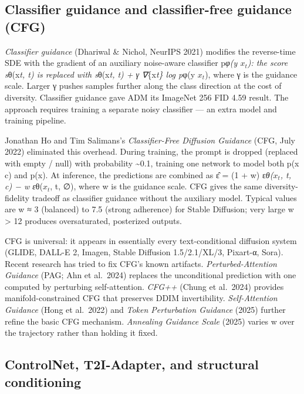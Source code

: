 \subsection{Classifier guidance and classifier-free guidance (CFG)}\label{classifier-guidance-and-classifier-free-guidance-cfg}

\emph{Classifier guidance} (Dhariwal \& Nichol, NeurIPS 2021) modifies the reverse-time SDE with the gradient of an auxiliary noise-aware classifier p\emph{φ(y \textbar{} \(x_t\)): the score s}θ(x\emph{t, t) is replaced with s}θ(x\emph{t, t) + γ ∇}\{x\emph{t\} log p}φ(y \textbar{} \(x_t\)), where γ is the guidance scale. Larger γ pushes samples further along the class direction at the cost of diversity. Classifier guidance gave ADM its ImageNet 256 FID 4.59 result. The approach requires training a separate noisy classifier --- an extra model and training pipeline.

Jonathan Ho and Tim Salimans's \emph{Classifier-Free Diffusion Guidance} (CFG, July 2022) eliminated this overhead. During training, the prompt is dropped (replaced with empty / null) with probability \textasciitilde0.1, training one network to model both p(x \textbar{} c) and p(x). At inference, the predictions are combined as ε̂ = (1 + w) ε\emph{θ(\(x_t\), t, c) − w ε}θ(\(x_t\), t, ∅), where w is the guidance scale. CFG gives the same diversity-fidelity tradeoff as classifier guidance without the auxiliary model. Typical values are w ≈ 3 (balanced) to 7.5 (strong adherence) for Stable Diffusion; very large w \textgreater{} 12 produces oversaturated, posterized outputs.

CFG is universal: it appears in essentially every text-conditional diffusion system (GLIDE, DALL-E 2, Imagen, Stable Diffusion 1.5/2.1/XL/3, Pixart-α, Sora). Recent research has tried to fix CFG's known artifacts. \emph{Perturbed-Attention Guidance} (PAG; Ahn et al.~2024) replaces the unconditional prediction with one computed by perturbing self-attention. \emph{CFG++} (Chung et al.~2024) provides manifold-constrained CFG that preserves DDIM invertibility. \emph{Self-Attention Guidance} (Hong et al.~2022) and \emph{Token Perturbation Guidance} (2025) further refine the basic CFG mechanism. \emph{Annealing Guidance Scale} (2025) varies w over the trajectory rather than holding it fixed.

\subsection{ControlNet, T2I-Adapter, and structural conditioning}\label{controlnet-t2i-adapter-and-structural-conditioning}

